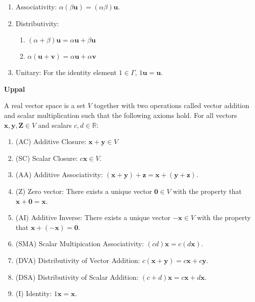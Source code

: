 \documentclass{article}
\newcommand{\bff}[1]{\mathbf{#1}}
\begin{document}
\begin{minipage}[t]{.45\textwidth}
\begin{enumerate}
\begin{enumerate}[label=\textbf{M\Roman*.}]
                    \item Associativity: $\alpha(\beta \bm{u}) = (\alpha \beta)\bm{u}$.
                    \item Distributivity:
                    \begin{enumerate}[label=(\alph*)]
                        \item $(\alpha+\beta)\bm{u} = \alpha\bm{u} + \beta\bm{u}$
                        \item $\alpha(\bm{u}+\bm{v}) = \alpha\bm{u}+\alpha\bm{v}$
                    \end{enumerate}
                    \item Unitary: For the identity element $1 \in \Gamma$, $1\bm{u}=\bm{u}$.
                \end{enumerate}
            \end{enumerate}
    \end{minipage} %
    \hfill
    \begin{minipage}[t]{.45\textwidth} %
        \begin{center}
            \textbf{Uppal}
        \end{center}
        A real vector space is a set $V$ together with two operations called vector addition and scalar multiplication such that the following axioms hold. For all vectors $\bff{x}, \bff{y}, \bff{Z} \in V$ and scalars $c,d \in \mathbb{R}$:
        \vspace{2mm}

        \begin{enumerate}
            \setlength\itemsep{1.5mm}
            \item (AC) Additive Closure: $\bff{x}+\bff{y} \in V$
            \item (SC) Scalar Closure: $c\bff{x} \in V$.
            \item (AA) Additive Associativity: $(\bff{x}+\bff{y})+\bff{z}=\bff{x}+(\bff{y}+\bff{z})$.
            \item (Z) Zero vector: There exists a unique vector $\bff{0} \in V$ with the property that $\bff{x}+\bff{0} = \bff{x}$.
            \item (AI) Additive Inverse: There exists a unique vector $\bff{-x} \in V$ with the property that $\bff{x} + (\bff{-x})=\bff{0}$.
            \item (SMA) Scalar Multipication Associativity: $(cd)\bff{x} = c(d\bff{x})$.
            \item (DVA) Distributivity of Vector Addition: $c(\bff{x}+\bff{y})=c\bff{x}+c\bff{y}$.
            \item (DSA) Distributivity of Scalar Addition: $(c+d)\bff{x}=c\bff{x}+d\bff{x}$.
            \item (I) Identity: $1\bff{x} = \bff{x}$.
        \end{enumerate}
    \end{minipage}
\end{document}
